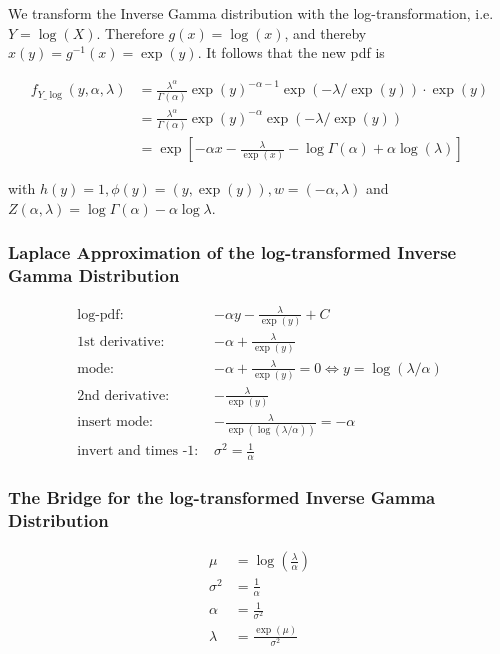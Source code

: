 We transform the Inverse Gamma distribution with the log-transformation, i.e. $Y = \log(X)$. Therefore $g(x) = \log(x)$, and thereby $x(y) = g^{-1}(x) = \exp(y)$. It follows that the new pdf is 

\begin{subequations}
\begin{align}
	f_{Y\_\log}(y, \alpha, \lambda) &= \frac{\lambda^{\alpha}}{\Gamma(\alpha)} \exp(y)^{-\alpha-1} \exp(-\lambda/\exp(y)) \cdot \exp(y) \\
	&=  \frac{\lambda^{\alpha}}{\Gamma(\alpha)} \exp(y)^{-\alpha} \exp(-\lambda/\exp(y)) \\
	&= \exp\left[-\alpha x - \frac{\lambda}{\exp(x)} - \log\Gamma(\alpha) + \alpha\log(\lambda)\right]
	\label{eq:inv_gamma_trans_pdf}
\end{align}
\end{subequations}


with $h(y) = 1, \phi(y) = (y, \exp(y)), w=(-\alpha, \lambda)$ and $Z(\alpha, \lambda) = \log\Gamma(\alpha) - \alpha \log \lambda$.

\subsubsection{Laplace Approximation of the log-transformed Inverse Gamma Distribution}


\begin{align*}
\text{log-pdf: } &-\alpha y - \frac{\lambda}{\exp(y)} + C \\
\text{1st derivative: }&  -\alpha + \frac{\lambda}{\exp(y)}\\
\text{mode: }&  -\alpha + \frac{\lambda}{\exp(y)} = 0 \Leftrightarrow y = \log(\lambda/\alpha)\\
\text{2nd derivative: }&  -\frac{\lambda}{\exp(y)}\\
\text{insert mode: }&  -\frac{\lambda}{\exp(\log(\lambda/\alpha))} = -\alpha\\
\text{invert and times -1: }&\sigma^2 = \frac{1}{\alpha}
\end{align*}

\subsubsection{The Bridge for the log-transformed Inverse Gamma Distribution}

\begin{subequations}
\begin{align}
	\mu &= \log\left(\frac{\lambda}{\alpha}\right) \\
	\sigma^2 &= \frac{1}{\alpha} \\
	\alpha &= \frac{1}{\sigma^2}\\
	\lambda &= \frac{\exp(\mu)}{\sigma^2}
\end{align}
\end{subequations}

